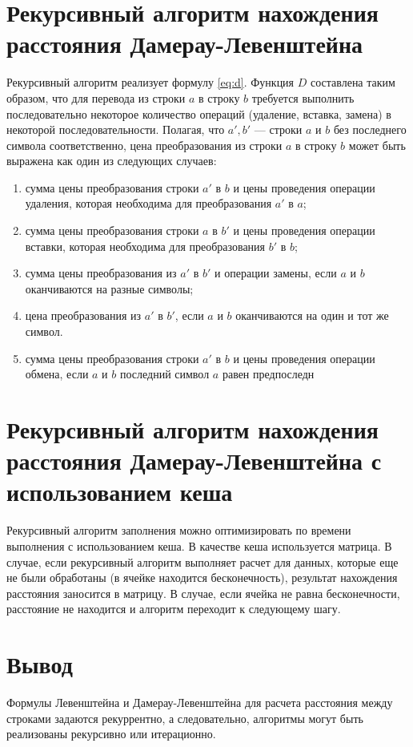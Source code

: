 \section{Рекурсивный алгоритм нахождения расстояния Дамерау-Левенштейна}
Рекурсивный алгоритм реализует формулу \ref{eq:d}.
Функция $D$ составлена таким образом, что для перевода из строки $a$ в строку $b$ требуется выполнить последовательно некоторое количество операций (удаление, вставка, замена) в некоторой последовательности. Полагая, что $a', b'$  — строки $a$ и $b$ без последнего символа соответственно, цена преобразования из строки $a$ в строку $b$ может быть выражена как один из следующих случаев:
\begin{enumerate}[label={\arabic*)}]
	\item сумма цены преобразования строки $a'$ в $b$ и цены проведения операции удаления, которая необходима для преобразования $a'$ в $a$;
	\item сумма цены преобразования строки $a$ в $b'$  и цены проведения операции вставки, которая необходима для преобразования $b'$ в $b$;
	\item сумма цены преобразования из $a'$ в $b'$ и операции замены, если $a$ и $b$ оканчиваются на разные символы;
	\item цена преобразования из $a'$ в $b'$, если $a$ и $b$ оканчиваются на один и тот же символ.
	\item сумма цены преобразования строки $a'$ в $b$ и цены проведения операции обмена, если $a$ и $b$ последний символ $a$ равен предпоследн   
\end{enumerate}

\section{Рекурсивный алгоритм нахождения расстояния Дамерау-Левенштейна с использованием кеша}
\label{sec:recmat}

Рекурсивный алгоритм заполнения можно оптимизировать по времени выполнения с использованием кеша. В качестве кеша используется матрица. 
В случае, если рекурсивный алгоритм выполняет расчет для данных, которые еще не были обработаны (в ячейке находится бесконечность), результат нахождения расстояния заносится в матрицу. В случае, если ячейка не равна бесконечности, расстояние не находится и алгоритм переходит к следующему шагу.



\section*{Вывод}

Формулы Левенштейна и Дамерау-Левенштейна для расчета расстояния между строками задаются рекуррентно, а следовательно, алгоритмы могут быть реализованы рекурсивно или итерационно.


